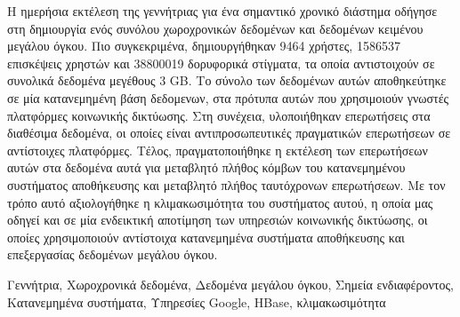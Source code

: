 \begin{abstractgr}
Η ημερήσια εκτέλεση της γεννήτριας για ένα σημαντικό χρονικό διάστημα οδήγησε στη \linebreak δημιουργία ενός συνόλου χωροχρονικών δεδομένων και δεδομένων κειμένου μεγάλου όγκου. 
Πιο συγκεκριμένα, δημιουργήθηκαν 9464 χρήστες, 1586537 επισκέψεις χρηστών και 38800019 \linebreak δορυφορικά στίγματα, τα οποία αντιστοιχούν σε συνολικά δεδομένα μεγέθους 3 GB.
Το σύνολο των δεδομένων αυτών αποθηκεύτηκε σε μία κατανεμημένη βάση δεδομενων, στα πρότυπα αυτών που χρησιμοιούν γνωστές 
πλατφόρμες κοινωνικής δικτύωσης. Στη συνέχεια, υλοποιήθηκαν επερωτήσεις στα διαθέσιμα δεδομένα, οι οποίες είναι αντιπροσωπευτικές πραγματικών 
επερωτήσεων σε \linebreak αντίστοιχες πλατφόρμες. Τέλος, πραγματοποιήθηκε η εκτέλεση των επερωτήσεων αυτών στα \linebreak δεδομένα αυτά για μεταβλητό πλήθος 
κόμβων του κατανεμημένου συστήματος αποθήκευσης και μεταβλητό πλήθος ταυτόχρονων επερωτήσεων. Με τον τρόπο αυτό αξιολογήθηκε η κλιμακωσιμότητα του συστήματος αυτού, η οποία μας οδηγεί και σε μία 
ενδεικτική αποτίμηση των υπηρεσιών \linebreak κοινωνικής δικτύωσης, οι οποίες χρησιμοποιούν αντίστοιχα κατανεμημένα συστήματα αποθήκευσης και επεξεργασίας
δεδομένων μεγάλου όγκου.


  \begin{keywordsgr}
  Γεννήτρια, Χωροχρονικά δεδομένα, Δεδομένα μεγάλου όγκου, Σημεία ενδιαφέροντος, \linebreak Κατανεμημένα συστήματα, Υπηρεσίες Google, HBase, κλιμακωσιμότητα
  \end{keywordsgr}
\end{abstractgr}
